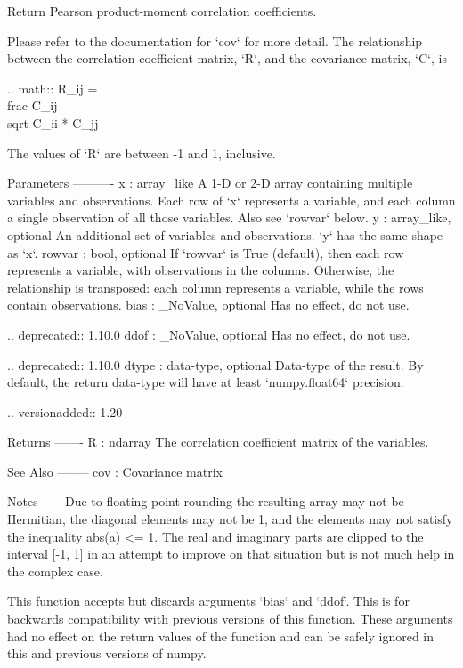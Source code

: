 \begin{DoxyVerb}Return Pearson product-moment correlation coefficients.

Please refer to the documentation for `cov` for more detail.  The
relationship between the correlation coefficient matrix, `R`, and the
covariance matrix, `C`, is

.. math:: R_{ij} = \\frac{ C_{ij} } { \\sqrt{ C_{ii} * C_{jj} } }

The values of `R` are between -1 and 1, inclusive.

Parameters
----------
x : array_like
    A 1-D or 2-D array containing multiple variables and observations.
    Each row of `x` represents a variable, and each column a single
    observation of all those variables. Also see `rowvar` below.
y : array_like, optional
    An additional set of variables and observations. `y` has the same
    shape as `x`.
rowvar : bool, optional
    If `rowvar` is True (default), then each row represents a
    variable, with observations in the columns. Otherwise, the relationship
    is transposed: each column represents a variable, while the rows
    contain observations.
bias : _NoValue, optional
    Has no effect, do not use.

    .. deprecated:: 1.10.0
ddof : _NoValue, optional
    Has no effect, do not use.

    .. deprecated:: 1.10.0
dtype : data-type, optional
    Data-type of the result. By default, the return data-type will have
    at least `numpy.float64` precision.

    .. versionadded:: 1.20

Returns
-------
R : ndarray
    The correlation coefficient matrix of the variables.

See Also
--------
cov : Covariance matrix

Notes
-----
Due to floating point rounding the resulting array may not be Hermitian,
the diagonal elements may not be 1, and the elements may not satisfy the
inequality abs(a) <= 1. The real and imaginary parts are clipped to the
interval [-1,  1] in an attempt to improve on that situation but is not
much help in the complex case.

This function accepts but discards arguments `bias` and `ddof`.  This is
for backwards compatibility with previous versions of this function.  These
arguments had no effect on the return values of the function and can be
safely ignored in this and previous versions of numpy.


\end{DoxyVerb}
